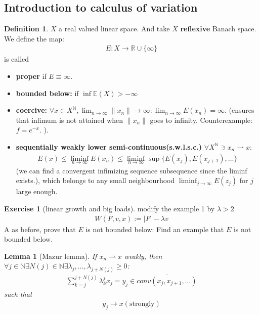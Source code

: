 \documentclass[a4paper,12pt,oneside,fleqn]{book}
\newtheorem{lemma}[theorem]{Lemma}
\theoremstyle{definition}
\newtheorem{definition}{Definition}[section]
\newtheorem{exercise}{Exercise}[chapter]
\theoremstyle{remark}
\begin{document}
\subsection{Introduction to calculus of variation}
\begin{definition}
	$X$ a real valued linear space. And take $X$ \textbf{reflexive} Banach space. We define the map:
	\begin{align*}
		E: X \rightarrow \mathbb{R} \cup \{\infty\}
	\end{align*}
	is called 
	\begin{itemize}
		\item \textbf{proper} if $E \equiv \infty$. 
		\item \textbf{bounded below:} if $\inf \mathbb{E}(X) > -\infty$
		\item \textbf{coercive:} $\forall x \in X^\mathbb{N}, \lim_{n \rightarrow \infty}\|x_n\| \rightarrow \infty: \lim_{ n\rightarrow \infty} E(x_n) = \infty$. (ensures that infimum is not attained when $\|x_n\|$ goes to infinity. Counterexample: $f = e^{-x}$. ). 
		\item \textbf{sequentially weakly lower semi-continuous(s.w.l.s.c.)} $\forall X^\mathbb{N} \ni x_n \rightharpoonup x:$
		\begin{align*}
			E(x) \le \liminf_{n \rightarrow \infty} E(x_n) \le  \liminf_{n \rightarrow \infty} \sup\{E(x_j), E(x_{j+1}), \dots\}
		\end{align*}
		 (we can find a convergent infimizing  sequence subsequence since the liminf exists.), which belongs to any small neighbourhood $\liminf_{j \rightarrow \infty} E(z_j)$ for $j$ large enough. 
	\end{itemize}
\end{definition}

\begin{exercise}[linear growth and big loads]
modify the example 1 by $\lambda > 2$ 
\begin{align*}
	W(F, v, x) := |F| - \lambda v
\end{align*}
A as before, prove that $E$ is not bounded below: Find an example that $E$ is not bounded below. 
\end{exercise}

\begin{lemma}[Mazur lemma]
	If $x_n \rightharpoonup x$ weakly, then $\forall j \in \mathbb{N} \exists N(j) \in \mathbb{N} \exists \lambda_j, \dots, \lambda_{j + N(j)} \geq 0$:
	\begin{align*}
		\sum_{k = j}^{j + N(j)} \lambda_k^j x_j = y_j \in \overline{conv(x_j, x_{j+1}, \dots)}
	\end{align*}
	such that
	\begin{align*}
		y_j \rightarrow x (\text{strongly})
	\end{align*}
\end{lemma}
\end{document}
